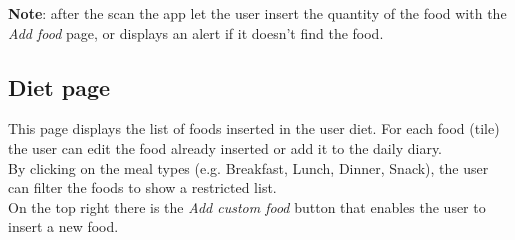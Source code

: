 \documentclass{Configuration_Files/PoliMi3i_thesis}
\begin{document}
\begin{minipage}{\linewidth}
    \textbf{Note}: after the scan the app let the user insert the quantity of the food with the \emph{Add food} page, or displays an alert if it doesn't find the food.
\end{minipage}

\clearpage

\subsection{Diet page}

\begin{minipage}{\linewidth}
    This page displays the list of foods inserted in the user diet. For each food (tile) the user can edit the food already inserted or add it to the daily diary.  \\
    By clicking on the meal types (e.g. Breakfast, Lunch, Dinner, Snack), the user can filter the foods to show a restricted list. \\
    On the top right there is the \emph{Add custom food} button that enables the user to insert a new food.
\end{minipage}
\end{document}
